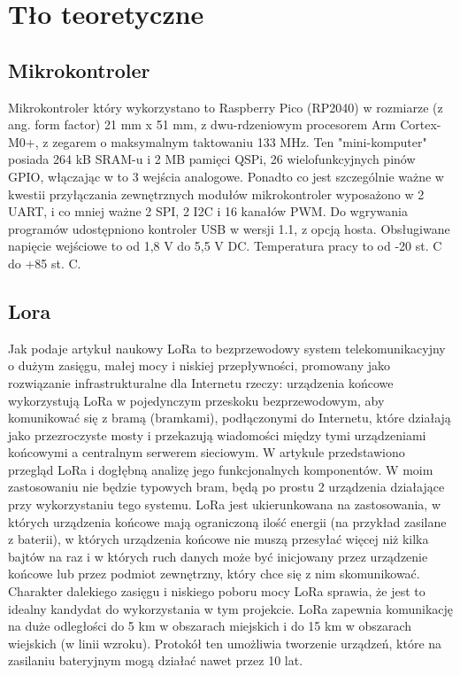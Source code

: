 \chapter{Tło teoretyczne}

\section{Mikrokontroler}
Mikrokontroler który wykorzystano to Raspberry Pico (RP2040)\cite{pico2024} w rozmiarze (z ang. form factor) 21 mm x 51 mm, z dwu-rdzeniowym procesorem Arm Cortex-M0+, z zegarem o maksymalnym taktowaniu 133 MHz. Ten "mini-komputer" posiada 264 kB SRAM-u i 2 MB pamięci QSPi, 26 wielofunkcyjnych pinów GPIO, włączając w to 3 wejścia analogowe.
Ponadto co jest szczególnie ważne w kwestii przyłączania zewnętrznych modułów mikrokontroler wyposażono w 2 UART, i co mniej ważne 2 SPI, 2 I2C i 16 kanałów PWM.
Do wgrywania programów udostępniono kontroler USB w wersji 1.1, z opcją hosta.
Obsługiwane napięcie wejściowe to od 1,8 V do 5,5 V DC.
Temperatura pracy to od -20 st. C do +85 st. C.
\section{Lora}
Jak podaje artykuł naukowy\cite{Augustin2016} LoRa to bezprzewodowy system telekomunikacyjny o dużym zasięgu, małej mocy i niskiej przepływności, promowany jako rozwiązanie infrastrukturalne dla Internetu rzeczy: urządzenia końcowe wykorzystują LoRa w pojedynczym przeskoku bezprzewodowym, aby komunikować się z bramą (bramkami), podłączonymi do Internetu, które działają jako przezroczyste mosty i przekazują wiadomości między tymi urządzeniami końcowymi a centralnym serwerem sieciowym. W artykule przedstawiono przegląd LoRa i dogłębną analizę jego funkcjonalnych komponentów.
W moim zastosowaniu nie będzie typowych bram, będą po prostu 2 urządzenia działające przy wykorzystaniu tego systemu.
LoRa jest ukierunkowana na zastosowania, w których urządzenia końcowe mają ograniczoną ilość energii (na przykład zasilane z baterii), w których urządzenia końcowe nie muszą przesyłać więcej niż kilka bajtów na raz i w których ruch danych może być inicjowany przez urządzenie końcowe lub przez podmiot zewnętrzny, który chce się z nim skomunikować. Charakter dalekiego zasięgu i niskiego poboru mocy LoRa sprawia, że jest to idealny kandydat do wykorzystania w tym projekcie.
LoRa zapewnia komunikację na duże odległości do 5 km w obszarach miejskich i do 15 km w obszarach wiejskich (w linii wzroku).
Protokół ten umożliwia tworzenie urządzeń, które na zasilaniu bateryjnym mogą działać nawet przez 10 lat.
